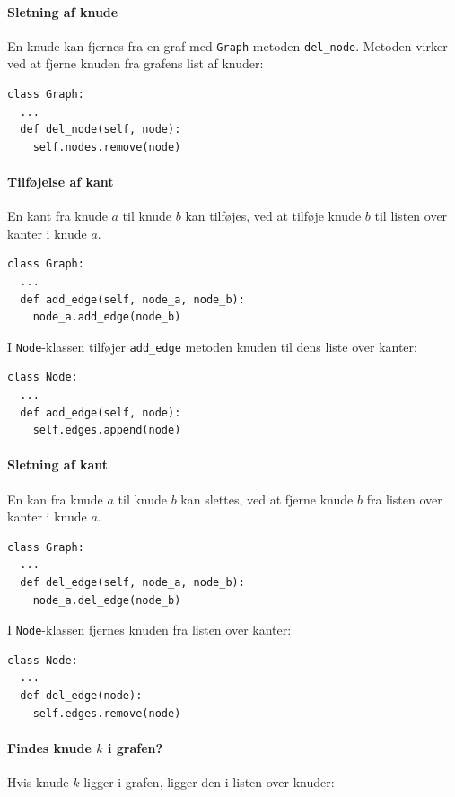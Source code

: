 \documentclass[10pt,a4paper,danish]{article}
\newcommand{\ct}{\texttt}
\begin{document}
\paragraph{Sletning af knude}
En knude kan fjernes fra en graf med \ct{Graph}-metoden
\ct{del\_node}. Metoden virker ved at fjerne knuden fra grafens list af
knuder:
{\small
\begin{verbatim}
class Graph:
  ...
  def del_node(self, node):
    self.nodes.remove(node)
\end{verbatim}}

\paragraph{Tilføjelse af kant}
En kant fra knude $a$ til knude $b$ kan tilføjes, ved at tilføje knude
$b$ til listen over kanter i knude $a$.

{\small
\begin{verbatim}
class Graph:
  ...
  def add_edge(self, node_a, node_b):
    node_a.add_edge(node_b)
\end{verbatim}}

I \ct{Node}-klassen tilføjer \ct{add\_edge} metoden knuden til dens
liste over kanter:
{\small
\begin{verbatim}
class Node:
  ...
  def add_edge(self, node):
    self.edges.append(node)
\end{verbatim}}

\paragraph{Sletning af kant}
En kan fra knude $a$ til knude $b$ kan slettes, ved at fjerne knude
$b$ fra listen over kanter i knude $a$.

{\small
\begin{verbatim}
class Graph:
  ...
  def del_edge(self, node_a, node_b):
    node_a.del_edge(node_b)
\end{verbatim}}

I \ct{Node}-klassen fjernes knuden fra listen over kanter:
{\small
\begin{verbatim}
class Node:
  ...
  def del_edge(node):
    self.edges.remove(node)
\end{verbatim}}


\paragraph{Findes knude $k$ i grafen?}
Hvis knude $k$ ligger i grafen, ligger den i listen over knuder:
\end{document}
